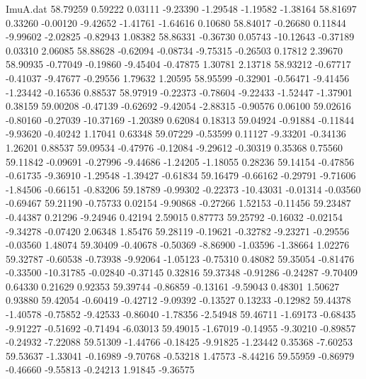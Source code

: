 \begin{filecontents}{ImuA.dat}
  58.79259    0.59222    0.03111   -9.23390   -1.29548   -1.19582   -1.38164
  58.81697    0.33260   -0.00120   -9.42652   -1.41761   -1.64616    0.10680
  58.84017   -0.26680    0.11844   -9.99602   -2.02825   -0.82943    1.08382
  58.86331   -0.36730    0.05743  -10.12643   -0.37189    0.03310    2.06085
  58.88628   -0.62094   -0.08734   -9.75315   -0.26503    0.17812    2.39670
  58.90935   -0.77049   -0.19860   -9.45404   -0.47875    1.30781    2.13718
  58.93212   -0.67717   -0.41037   -9.47677   -0.29556    1.79632    1.20595
  58.95599   -0.32901   -0.56471   -9.41456   -1.23442   -0.16536    0.88537
  58.97919   -0.22373   -0.78604   -9.22433   -1.52447   -1.37901    0.38159
  59.00208   -0.47139   -0.62692   -9.42054   -2.88315   -0.90576    0.06100
  59.02616   -0.80160   -0.27039  -10.37169   -1.20389    0.62084    0.18313
  59.04924   -0.91884   -0.11844   -9.93620   -0.40242    1.17041    0.63348
  59.07229   -0.53599    0.11127   -9.33201   -0.34136    1.26201    0.88537
  59.09534   -0.47976   -0.12084   -9.29612   -0.30319    0.35368    0.75560
  59.11842   -0.09691   -0.27996   -9.44686   -1.24205   -1.18055    0.28236
  59.14154   -0.47856   -0.61735   -9.36910   -1.29548   -1.39427   -0.61834
  59.16479   -0.66162   -0.29791   -9.71606   -1.84506   -0.66151   -0.83206
  59.18789   -0.99302   -0.22373  -10.43031   -0.01314   -0.03560   -0.69467
  59.21190   -0.75733    0.02154   -9.90868   -0.27266    1.52153   -0.11456
  59.23487   -0.44387    0.21296   -9.24946    0.42194    2.59015    0.87773
  59.25792   -0.16032   -0.02154   -9.34278   -0.07420    2.06348    1.85476
  59.28119   -0.19621   -0.32782   -9.23271   -0.29556   -0.03560    1.48074
  59.30409   -0.40678   -0.50369   -8.86900   -1.03596   -1.38664    1.02276
  59.32787   -0.60538   -0.73938   -9.92064   -1.05123   -0.75310    0.48082
  59.35054   -0.81476   -0.33500  -10.31785   -0.02840   -0.37145    0.32816
  59.37348   -0.91286   -0.24287   -9.70409    0.64330    0.21629    0.92353
  59.39744   -0.86859   -0.13161   -9.59043    0.48301    1.50627    0.93880
  59.42054   -0.60419   -0.42712   -9.09392   -0.13527    0.13233   -0.12982
  59.44378   -1.40578   -0.75852   -9.42533   -0.86040   -1.78356   -2.54948
  59.46711   -1.69173   -0.68435   -9.91227   -0.51692   -0.71494   -6.03013
  59.49015   -1.67019   -0.14955   -9.30210   -0.89857   -0.24932   -7.22088
  59.51309   -1.44766   -0.18425   -9.91825   -1.23442    0.35368   -7.60253
  59.53637   -1.33041   -0.16989   -9.70768   -0.53218    1.47573   -8.44216
  59.55959   -0.86979   -0.46660   -9.55813   -0.24213    1.91845   -9.36575

\end{filecontents}
